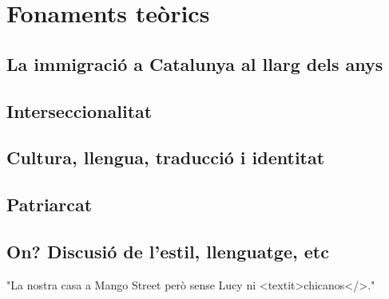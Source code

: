 \section{Fonaments teòrics}

\subsection{La immigració a Catalunya al llarg dels anys}
\subsection{Interseccionalitat}
\subsection{Cultura, llengua, traducció i identitat}
\subsection{Patriarcat}
\subsection{On? Discusió de l'estil, llenguatge, etc}


"La nostra casa a Mango Street però sense Lucy ni <textit>chicanos</>."


\begin{comment}
\subsection{Weitere interessante Anmerkungen}

* es wird nie klar wie die Tochter heißt; Universalität? Kann sich jede* damit identifizieren? (insgesamt werden ganz selten Namen erwaehnt. Aus irgendeinem Grund werden die Liebhaber*innen Mimouns meist mit Namen erwaehnt; der Name der Mutter kommt 2 mal vor)
* interessante Erzählweise: eine Figur erzählt in 1. Person, trotzdem auktoriale Erzählung
* referències a la Mercè Rodoreda: vinculació amb la cultura/tradició literària catalana
* keine graphisch markierte direkte Rede: alles ist ein Textfluss; stream of consciousness
* eine Möglichkeit: biographisches Lesen

\end{comment}

